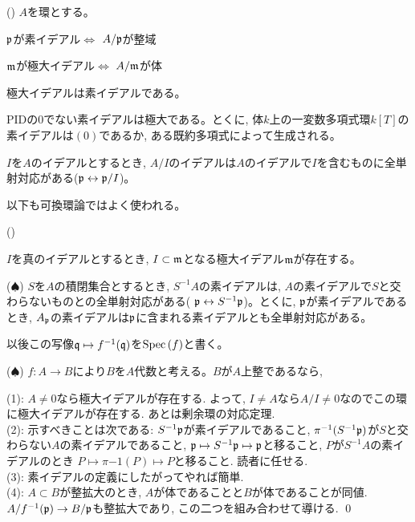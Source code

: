 \begin{prop} \checkbox () $A$を環とする。
\ben
\item $\mathfrak{p}$が素イデアル$\iff$ $A/\mathfrak{p}$が整域
\item $\mathfrak{m}$が極大イデアル$\iff$ $A/\mathfrak{m}$が体
\item 極大イデアルは素イデアルである。
\item PIDの0でない素イデアルは極大である。とくに, 体$k$上の一変数多項式環$k[T]$の素イデアルは$(0)$であるか, ある既約多項式によって生成される。
\item  $I$を$A$のイデアルとするとき, $A/I$のイデアルは$A$のイデアルで$I$を含むものに全単射対応がある($\mathfrak{p}\leftrightarrow \mathfrak{p}/I$)。
\item
\een
\end{prop}
以下も可換環論ではよく使われる。
\begin{prop} ()
\ben
\item $I$を真のイデアルとするとき, $I\subset \mathfrak{m}$となる極大イデアル$\mathfrak{m}$が存在する。
\item ($\spadesuit$) $S$を$A$の積閉集合とするとき, $S^{-1}A$の素イデアルは, $A$の素イデアルで$S$と交わらないものとの全単射対応がある( $\mathfrak{p}\leftrightarrow S^{-1}\mathfrak{p}$)。とくに, $\mathfrak{p}$が素イデアルであるとき, $A_{\mathfrak{p}}$の素イデアルは$\mathfrak{p}$に含まれる素イデアルとも全単射対応がある。
\item {}以後この写像$\mathfrak{q}\mapsto f^{-1}(\mathfrak{q})$を$\mathrm{Spec}\left( f \right)$と書く。
\item ($\spadesuit$) $f:A\to B$により$B$を$A$代数と考える。$B$が$A$上整であるなら,
\item
\een
\end{prop}
\prf (1): $A\neq 0$なら極大イデアルが存在する. よって, $I\neq A$なら$A/I\neq 0$なのでこの環に極大イデアルが存在する. あとは剰余環の対応定理.\\
(2): 示すべきことは次である: $S^{-1}\mathfrak{p}$が素イデアルであること, $\pi^{-1}(S^{-1}\mathfrak{p})$が$S$と交わらない$A$の素イデアルであること, $\mathfrak{p}\mapsto S^{-1}\mathfrak{p}\mapsto \mathfrak{p}$と移ること, $P$が$S^{-1}A$の素イデアルのとき $P\mapsto \pi{-1}(P) \mapsto P$と移ること. 読者に任せる. \\
(3): 素イデアルの定義にしたがってやれば簡単. \\
(4): $A\subset B$が整拡大のとき, $A$が体であることと$B$が体であることが同値. $A/f^{-1}(\mathfrak{p}) \to B/\mathfrak{p}$も整拡大であり, この二つを組み合わせて導ける. \qed






